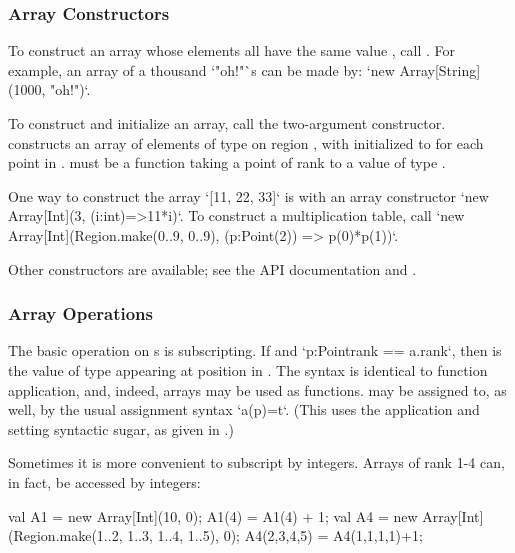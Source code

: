 \subsubsection{Array Constructors}

To construct an array whose elements all have the same value , call
. 
For example, an array of a thousand \xcd`"oh!"`s can be made by:
\xcd`new Array[String](1000, "oh!")`.


To construct and initialize an array, call the two-argument constructor. 
 constructs an array of elements of type  on
region , with  initialized to  for each point
 in .   must be a function taking a point of rank
 to a value of type .  

\begin{ex}
One way to construct the array \xcd`[11, 22, 33]` is with an array constructor
\xcd`new Array[Int](3, (i:int)=>11*i)`. 
To construct a multiplication table, call
\xcd`new Array[Int](Region.make(0..9, 0..9), (p:Point(2)) => p(0)*p(1))`.
\end{ex}

Other constructors are available; see the API documentation and
. 

\subsubsection{Array Operations}

The basic operation on s is subscripting.  If  and 
\xcd`p:Point{rank == a.rank}`, then  is the value of type 
appearing at position  in .    The syntax is identical to
function application, and, indeed, arrays may be used as functions.
 may be assigned to, as well, by the usual assignment syntax
\xcd`a(p)=t`.
(This uses the application and setting syntactic sugar, as given in .)

Sometimes it is more convenient to subscript by integers.  Arrays of rank 1-4
can, in fact, be accessed by integers: 
\begin{xten}
val A1 = new Array[Int](10, 0);
A1(4) = A1(4) + 1;
val A4 = new Array[Int](Region.make(1..2, 1..3, 1..4, 1..5), 0);
A4(2,3,4,5) = A4(1,1,1,1)+1;
\end{xten}



